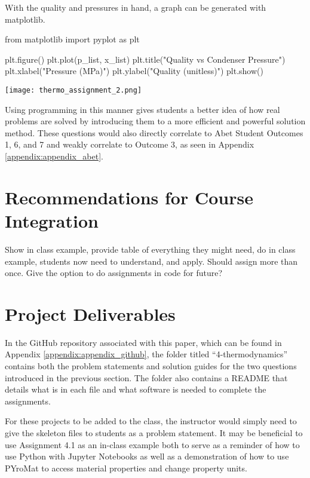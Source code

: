 \begin{tcolorbox}[breakable, enhanced jigsaw, title=ME 513: Assignment \ref{thermo_assignment_2}, 
    colframe=ksu-purple, colback=ksu-gray]
    With the quality and pressures in hand, a graph can be generated with matplotlib.

\begin{python}
from matplotlib import pyplot as plt

plt.figure()
plt.plot(p_list, x_list)
plt.title("Quality vs Condenser Pressure")
plt.xlabel("Pressure (MPa)")
plt.ylabel("Quality (unitless)")
plt.show()
\end{python}
\begin{center}
    \texttt{[image: thermo\_assignment\_2.png]}
\end{center}
\end{tcolorbox}

Using programming in this manner gives students a better idea of how real problems are solved by introducing
them to a more efficient and powerful solution method. These questions would also directly correlate to Abet 
Student Outcomes 1, 6, and 7 and weakly correlate to Outcome 3, as seen in Appendix \ref{appendix:appendix_abet}.

\section{Recommendations for Course Integration}

Show in class example, provide table of everything they might need, do in class example, students now need to
understand, and apply. Should assign more than once. Give the option to do assignments in code for future?


\section{Project Deliverables}

In the GitHub repository associated with this paper, which can be found in Appendix \ref{appendix:appendix_github},
the folder titled ``4-thermodynamics'' contains both the problem statements and solution guides for the two questions
introduced in the previous section. The folder also contains a README that details what is in each file and 
what software is needed to complete the assignments. 

For these projects to be added to the class, the instructor would simply need to give the skeleton files to 
students as a problem statement. It may be beneficial to use Assignment 4.1 as an in-class example both to serve 
as a reminder of how to use Python with Jupyter Notebooks as well as a demonstration of how to use PYroMat to 
access material properties and change property units.
